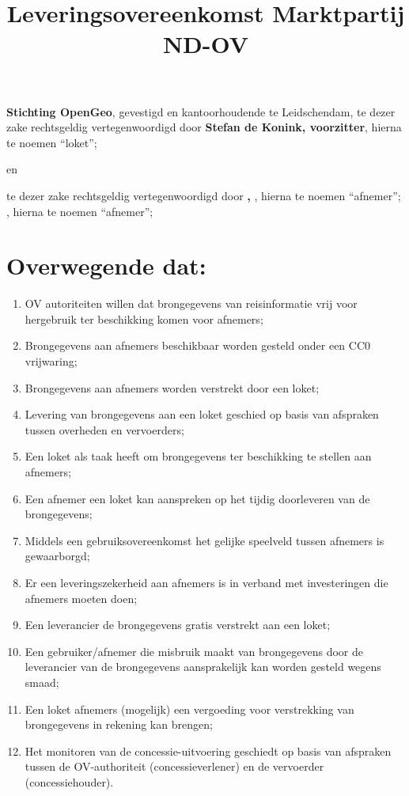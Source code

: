 \documentclass[10pt, a4paper]{article}
\title{Leveringsovereenkomst Marktpartij ND-OV\vspace{-2ex}}
\begin{document}
\maketitle
\thispagestyle{empty}
\pagestyle{empty}
\textbf{Stichting OpenGeo}, gevestigd en kantoorhoudende te Leidschendam, te dezer zake rechtsgeldig vertegenwoordigd door \textbf{Stefan de Konink, voorzitter}, hierna te noemen ``loket'';
\begin{center}
en\\
\end{center}
\ifdefined\onderneming
    \textbf{\onderneming} te dezer zake rechtsgeldig vertegenwoordigd door \textbf{\tekenbevoegd, \functie}, hierna te noemen ``afnemer'';
\else
    \textbf{\tekenbevoegd}, hierna te noemen ``afnemer'';
\fi

\section*{Overwegende dat:}
\begin{enumerate}
\item OV autoriteiten willen dat brongegevens van reisinformatie vrij voor hergebruik ter beschikking komen voor afnemers;
\item Brongegevens aan afnemers beschikbaar worden gesteld onder een CC0 vrijwaring;
\item Brongegevens aan afnemers worden verstrekt door een loket;
\item Levering van brongegevens aan een loket geschied op basis van afspraken tussen overheden en vervoerders;
\item Een loket als taak heeft om brongegevens ter beschikking te stellen aan afnemers;
\item Een afnemer een loket kan aanspreken op het tijdig doorleveren van de brongegevens;
\item Middels een gebruiksovereenkomst het gelijke speelveld tussen afnemers is gewaarborgd;
\item Er een leveringszekerheid aan afnemers is in verband met investeringen die afnemers moeten doen;
\item Een leverancier de brongegevens gratis verstrekt aan een loket;
\item Een gebruiker/afnemer die misbruik maakt van brongegevens door de leverancier van de brongegevens aansprakelijk kan worden gesteld wegens smaad;
\item Een loket afnemers (mogelijk) een vergoeding voor verstrekking van brongegevens in rekening kan brengen;
\item Het monitoren van de concessie-uitvoering geschiedt op basis van afspraken tussen de OV-authoriteit (concessieverlener) en de vervoerder (concessiehouder).
\end{enumerate}
\end{document}
